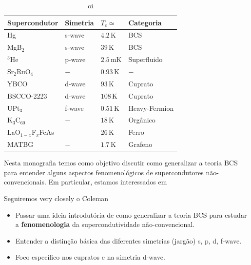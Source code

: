 \documentclass[a4paper,10pt]{article}
\begin{document}
\begin{table}[H]
\begin{center}
\begin{tabular}{ |p{3cm}||p{3cm}|p{3cm}|p{3cm}|  }
\hline
Supercondutor & Simetria & $T_c \simeq$ & Categoria \\
\hline
Hg                   & s-wave   & $4.2   \, \text{K}$      & BCS \\
MgB$_2$              & s-wave   & $39    \, \text{K}$      & BCS \\
$^3$He               & p-wave   & $2.5   \, \text{mK}$     & Superfluido \\
Sr$_2$RuO$_4$        & $-$      & $0.93  \, \text{K}$      & $-$ \\
YBCO                 & d-wave   & $93  \, \text{K}$        & Cuprato \\
BSCCO-2223           & d-wave   & $108   \, \text{K}$      & Cuprato \\
UPt$_3$              & f-wave   & $0.51  \, \text{K}$      & Heavy-Fermion \\
K$_3$C$_{60}$        & $-$      & $18    \, \text{K}$      & Orgânico  \\
LaO$_{1-x}$F$_x$FeAs & $-$      & $26    \, \text{K}$      & Ferro  \\
MATBG                & $-$      & $1.7    \, \text{K}$     & Grafeno  \\
\hline
\end{tabular}
\end{center}
\caption{oi}
\label{tab:superconductors}
\end{table}


Nesta monografia temos como objetivo discutir como generalizar a teoria BCS para entender alguns aspectos fenomenológicos de supercondutores não-convencionais. Em particular, estamos interessados em

Seguiremos very closely o Coleman \cite{coleman}


\begin{itemize}
\item Passar uma ideia introdutória de como generalizar a teoria BCS para estudar a \textbf{fenomenologia} da supercondutividade não-convencional.

\item Entender a distinção básica das diferentes simetrias (jargão) s, p, d, f-wave.

\item Foco específico nos cupratos e na simetria d-wave.
\end{itemize}
\end{document}
